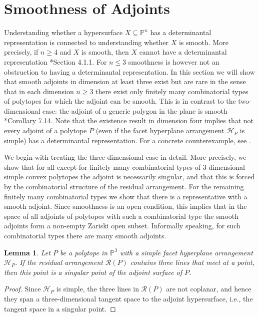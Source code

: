 \documentclass[a4paper,10pt]{amsart}
\theoremstyle{definition}
\theoremstyle{plain}
\newtheorem{lem}[Def]{Lemma}
\newcommand{\cR}{{\mathcal R}}
\newcommand{\pp}{\mathbb{P}}
\begin{document}
\section{Smoothness of Adjoints} \label{sec:smooth} 
Understanding whether a hypersurface $X\subseteq\mathbb{P}^n$ has a determinantal representation is connected to understanding whether $X$ is smooth. More precisely, if $n\geq 4$ and $X$ is smooth, then $X$ cannot have a determinantal representation \cite{Dolgachev2012CAG}*{Section 4.1.1}. For $n\leq 3$ smoothness is however not an obstruction to having a determinantal representation. In this section we will show that smooth adjoints in dimension at least three exist but are rare in the sense that in each dimension $n\geq 3$ there exist only finitely many combinatorial types of polytopes for which the adjoint can be smooth. This is in contrast to the two-dimensional case: the adjoint of a generic polygon in the plane is smooth \cite{telen2025toric}*{Corollary 7.14}. Note that the existence result in dimension four implies that not every adjoint of a polytope $P$ (even if the facet hyperplane arrangement $\mathcal{H}_P$ is simple) has a determinantal representation. For a concrete counterexample, see . 

We begin with treating the three-dimensional case in detail. 
More precisely, we show that for all except for finitely many combinatorial types of 3-dimensional simple convex polytopes the adjoint is necessarily singular, and that this is forced by the combinatorial structure of the residual arrangement. For the remaining finitely many combinatorial types we show that there is a representative with a smooth adjoint. Since smoothness is an open condition, this implies that in the space of all adjoints of polytopes with such a combinatorial type the smooth adjoints form a non-empty Zariski open subset. Informally speaking, for such combinatorial types there are many smooth adjoints.


\begin{lem} \label{lem:threelines}
    Let $P$ be a polytope in $\pp^3$ with a simple facet hyperplane arrangement $\mathcal{H}_P$. If the residual arrangement $\cR(P)$ contains three lines that meet at a point, then this point is a singular point of the adjoint surface of $P$.
\end{lem}

\begin{proof}
    Since $\mathcal{H}_P$ is simple, the three lines in $\cR(P)$ are not coplanar, and hence they span a three-dimensional tangent space to the adjoint hypersurface, i.e., the tangent space in a singular point.
\end{proof}
\end{document}
